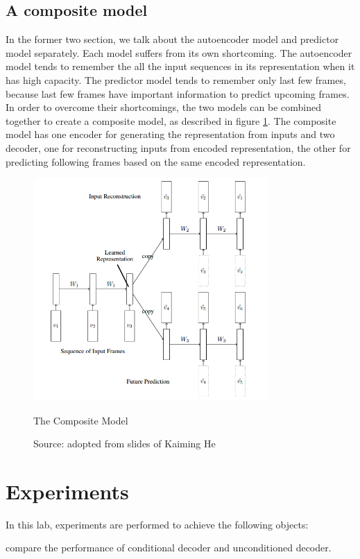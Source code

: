\documentclass[twoside,a4paper,article]{combine}
\begin{document}
\subsection{A composite model}
In the former two section, we talk about the autoencoder model and predictor model separately. Each model suffers from its own
shortcoming. The autoencoder model tends to remember the all the input sequences in its representation when it has high capacity.
The predictor model tends to remember only last few frames, because last few frames have important information to predict upcoming frames.
In order to overcome their shortcomings, the two models can be combined together to create a composite model, as described in figure
\ref{fig:composite}. The composite model has one
encoder for generating the representation from inputs and two decoder, one for reconstructing inputs from encoded representation, the other
for predicting following frames based on the same encoded representation. 
\begin{figure}[ht!]
    \centering
    \includegraphics[width=0.8\textwidth]{composite}
    \caption{The Composite Model}
    \caption*{Source: adopted from slides of Kaiming He}
    \label{fig:composite}
\end{figure}

\section{Experiments}
In this lab, experiments are performed to achieve the following objects:

compare the performance of conditional decoder and unconditioned decoder.
\end{document}
